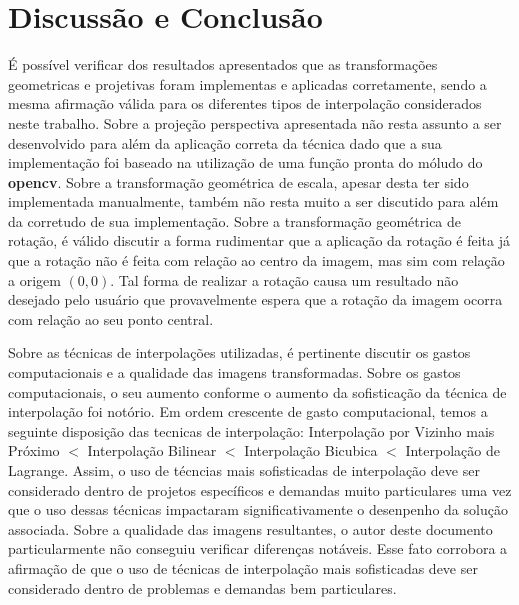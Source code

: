 \documentclass{article}
\begin{document}
%
\section{Discussão e Conclusão}
É possível verificar dos resultados apresentados que as transformações geometricas e projetivas foram implementas e aplicadas corretamente, sendo a mesma afirmação válida para os diferentes tipos de interpolação considerados neste trabalho. Sobre a projeção perspectiva apresentada não resta assunto a ser desenvolvido para além da aplicação correta da técnica dado que a sua implementação foi baseado na utilização de uma função pronta do móludo do \textbf{opencv}. Sobre a transformação geométrica de escala, apesar desta ter sido implementada manualmente, também não resta muito a ser discutido para além da corretudo de sua implementação. Sobre a transformação geométrica de rotação, é válido discutir a forma rudimentar que a aplicação da rotação é feita já que a rotação não é feita com relação ao centro da imagem, mas sim com relação a origem $(0,0)$. Tal forma de realizar a rotação causa um resultado não desejado pelo usuário que provavelmente espera que a rotação da imagem ocorra com relação ao seu ponto central.


Sobre as técnicas de interpolações utilizadas, é pertinente discutir os gastos computacionais e a qualidade das imagens transformadas. Sobre os gastos computacionais, o seu aumento conforme o aumento da sofisticação da técnica de interpolação foi notório. Em ordem crescente de gasto computacional, temos a seguinte disposição das tecnicas de interpolação: Interpolação por Vizinho mais Próximo $<$ Interpolação Bilinear $<$ Interpolação Bicubica $<$ Interpolação de Lagrange. Assim, o uso de técncias mais sofisticadas de interpolação deve ser considerado dentro de projetos específicos e demandas muito particulares uma vez que o uso dessas técnicas impactaram significativamente o desenpenho da solução associada. Sobre a qualidade das imagens resultantes, o autor deste documento particularmente não conseguiu verificar diferenças notáveis. Esse fato corrobora a afirmação de que o uso de técnicas de interpolação mais sofisticadas deve ser considerado dentro de problemas e demandas bem particulares.
\end{document}
